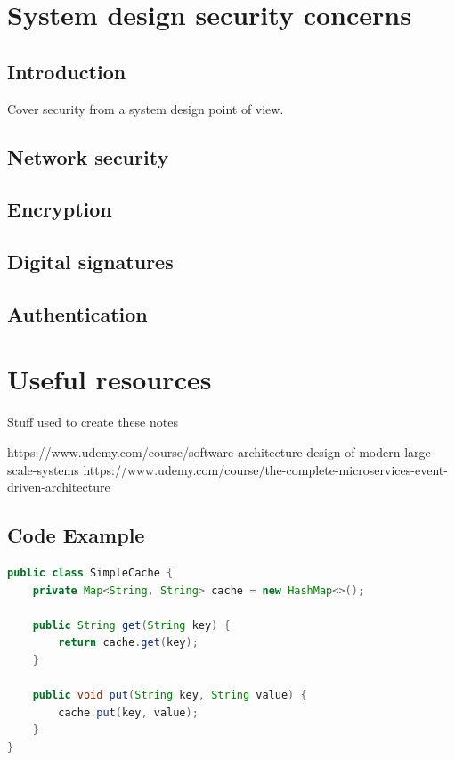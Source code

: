 \documentclass[a4paper, 11pt]{book}
\begin{document}
    \chapter{System design security concerns}


    \section{Introduction}
    Cover security from a system design point of view.


    \section{Network security}


    \section{Encryption}


    \section{Digital signatures}


    \section{Authentication}


    \chapter{Useful resources}
    Stuff used to create these notes

    https://www.udemy.com/course/software-architecture-design-of-modern-large-scale-systems
    https://www.udemy.com/course/the-complete-microservices-event-driven-architecture

    \newpage



    \section{Code Example}
    \begin{lstlisting}[language=Java, caption=Java Code for a Simple Cache]
public class SimpleCache {
    private Map<String, String> cache = new HashMap<>();

    public String get(String key) {
        return cache.get(key);
    }

    public void put(String key, String value) {
        cache.put(key, value);
    }
}
    \end{lstlisting}
\end{document}
